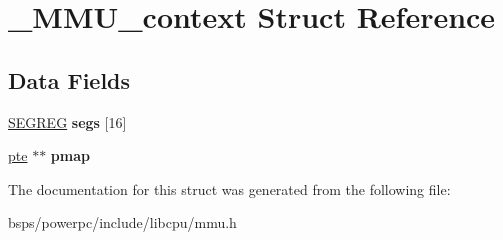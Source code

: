 \hypertarget{struct__MMU__context}{}\section{\+\_\+\+M\+M\+U\+\_\+context Struct Reference}
\label{struct__MMU__context}
\subsection*{Data Fields}
\begin{DoxyCompactItemize}
\item 
\mbox{\label{struct__MMU__context_a62546f43acf750940f4ebcbbfb73193d}} 
\mbox{\hyperlink{struct__SEGREG}{S\+E\+G\+R\+EG}} {\bfseries segs} \mbox{[}16\mbox{]}
\item 
\mbox{\label{struct__MMU__context_acd47c8d772a3117d4b212b8c72e296fd}} 
\mbox{\hyperlink{struct__pte}{pte}} $\ast$$\ast$ {\bfseries pmap}
\end{DoxyCompactItemize}


The documentation for this struct was generated from the following file\+:\begin{DoxyCompactItemize}
\item 
bsps/powerpc/include/libcpu/mmu.\+h\end{DoxyCompactItemize}
